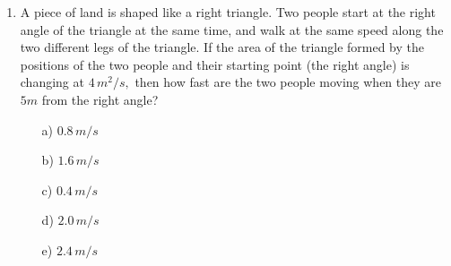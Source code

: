 \documentclass[dvips, 12pt,a4paper]{article}
\begin{document}
\begin{enumerate}
\item A piece of land is shaped like a right triangle. Two people start at the right angle of the triangle at the same time, and walk at the same speed along the two different legs of the triangle. If the area of the triangle formed by the positions of the two people and their starting point (the right angle) is changing at $4\,m^2/s,$ then how fast are the two people moving when they are $5m$ from the right angle?
\\[0.2in]
\begin{itemize}
\item [a)]$0.8\,m/s$
\item [b)]$1.6\,m/s$
\item [c)]$0.4\,m/s$
\item [d)]$2.0\,m/s$
\item [e)]$2.4\,m/s$
\end{itemize}

\end{enumerate}
\end{document}

